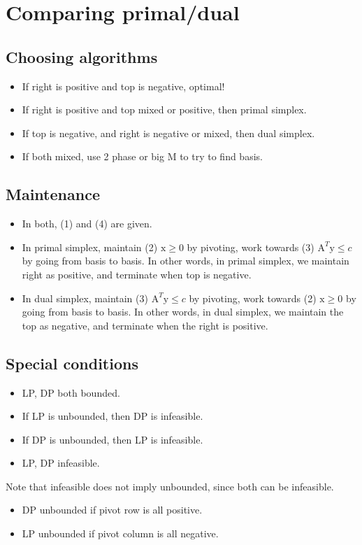 \documentclass[6pt]{article}
\def\x{\textrm{x}}
\def\y{\textrm{y}}
\def\A{\textrm{A}}
\begin{document}
\section{Comparing primal/dual}
\subsection{Choosing algorithms}
\begin{itemize}
    \item If right is positive and top is negative, optimal!
    \item If right is positive and top mixed or positive, then primal simplex.
    \item If top is negative, and right is negative or mixed, then dual simplex.
    \item If both mixed, use 2 phase or big M to try to find basis.
\end{itemize}

\subsection{Maintenance}
\begin{itemize}
    \item In both, (1) and (4) are given.
    \item In primal simplex, maintain (2) $\x\geq 0$ by pivoting, work towards (3) $\A^T\y\leq c$ by going from basis to basis. In other words, in primal simplex, we maintain right as positive, and terminate when top is negative.
    \item In dual simplex, maintain (3) $\A^T\y\leq c$ by pivoting, work towards (2) $\x\geq 0$ by going from basis to basis. In other words, in dual simplex, we maintain the top as negative, and terminate when the right is positive.
\end{itemize}

\subsection{Special conditions}
\begin{itemize}
    \item LP, DP both bounded.
    \item If LP is unbounded, then DP is infeasible.
    \item If DP is unbounded, then LP is infeasible.
    \item LP, DP infeasible.
\end{itemize}
Note that infeasible does not imply unbounded, since both can be infeasible.
\begin{itemize}
    \item DP unbounded if pivot row is all positive.
    \item LP unbounded if pivot column is all negative.
\end{itemize}{}
\end{document}
